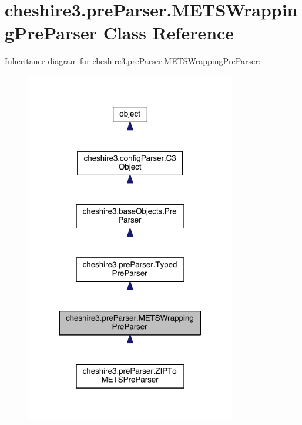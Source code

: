 \hypertarget{classcheshire3_1_1pre_parser_1_1_m_e_t_s_wrapping_pre_parser}{\section{cheshire3.\-pre\-Parser.\-M\-E\-T\-S\-Wrapping\-Pre\-Parser Class Reference}
\label{classcheshire3_1_1pre_parser_1_1_m_e_t_s_wrapping_pre_parser}
}


Inheritance diagram for cheshire3.\-pre\-Parser.\-M\-E\-T\-S\-Wrapping\-Pre\-Parser\-:
\nopagebreak
\begin{figure}[H]
\begin{center}
\leavevmode
\includegraphics[width=260pt]{classcheshire3_1_1pre_parser_1_1_m_e_t_s_wrapping_pre_parser__inherit__graph}
\end{center}
\end{figure}


